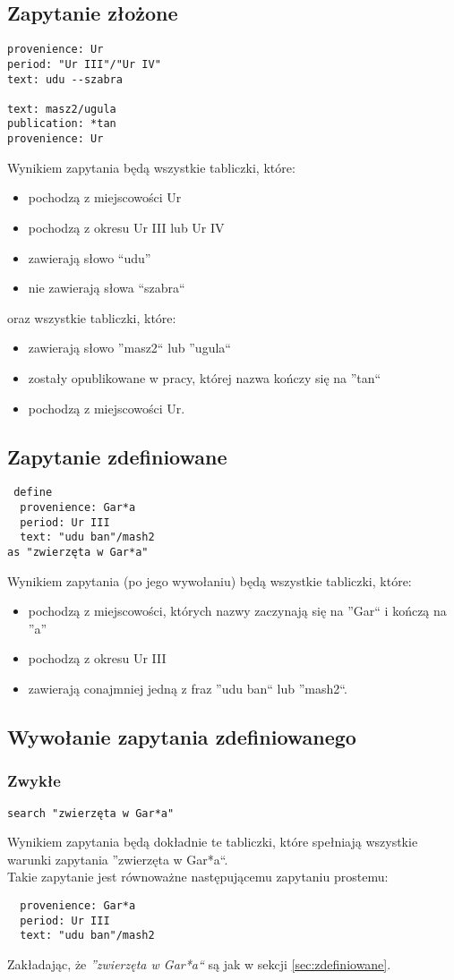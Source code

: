 \subsection{Zapytanie złożone}
\begin{verbatim}
provenience: Ur
period: "Ur III"/"Ur IV"
text: udu --szabra

text: masz2/ugula
publication: *tan
provenience: Ur
\end{verbatim}
Wynikiem zapytania będą wszystkie tabliczki, które:
\begin{itemize}
 \item pochodzą z miejscowości Ur
 \item pochodzą z okresu Ur III lub Ur IV
 \item zawierają słowo ``udu''
 \item nie zawierają słowa ``szabra``
\end{itemize}
oraz wszystkie tabliczki, które:
\begin{itemize}
 \item zawierają słowo ''masz2`` lub ''ugula``
 \item zostały opublikowane w pracy, której nazwa kończy się na ''tan``
 \item pochodzą z miejscowości Ur.
\end{itemize}


\subsection{\label{sec:zdefiniowane} Zapytanie zdefiniowane}
\begin{verbatim}
 define
  provenience: Gar*a
  period: Ur III
  text: "udu ban"/mash2
as "zwierzęta w Gar*a"
\end{verbatim}
Wynikiem zapytania (po jego wywołaniu) będą wszystkie tabliczki, które:
\begin{itemize}
\item pochodzą z miejscowości, których nazwy zaczynają się na ''Gar`` i kończą na ''a''
\item pochodzą z okresu Ur III
\item zawierają conajmniej jedną z fraz ''udu ban`` lub ''mash2``.
\end{itemize}

\subsection{Wywołanie zapytania zdefiniowanego}
\subsubsection{Zwykłe}
\begin{verbatim}
search "zwierzęta w Gar*a"
\end{verbatim}
Wynikiem zapytania będą dokładnie te tabliczki, które spełniają wszystkie warunki zapytania ''zwierzęta w Gar*a``.\\
Takie zapytanie jest równoważne następującemu zapytaniu prostemu:
\begin{verbatim}
  provenience: Gar*a
  period: Ur III
  text: "udu ban"/mash2
\end{verbatim}
Zakładając, że \textit{''zwierzęta w Gar*a``} są jak w sekcji \ref{sec:zdefiniowane}.
